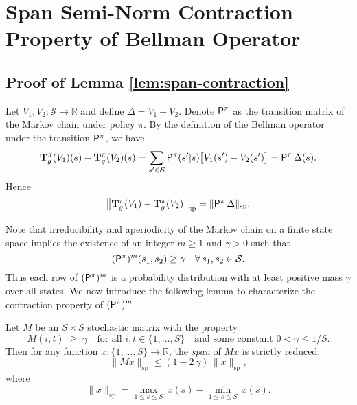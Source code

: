 \appendix

\section{Span Semi-Norm Contraction Property of Bellman Operator}
\subsection{Proof of Lemma \ref{lem:span-contraction}} \label{proofspan-contraction}

Let $V_1, V_2 : \mathcal{S}\to \mathbb{R}$ and define $\Delta = V_1 - V_2$.
Denote $\mathsf P^\pi$ as the transition matrix of the Markov chain under policy $\pi$. By the definition of the Bellman operator under the transition $\mathsf P^\pi$, we have
\begin{equation}
    \mathbf{T}_g^\pi(V_1)(s)- \mathbf{T}_g^\pi(V_2)(s)=\sum_{s' \in \mathcal{S}}
\mathsf P^\pi(s'| s)
\bigl[V_1(s') - V_2(s')\bigr]=\mathsf P^\pi \,\Delta (s).
\end{equation}
Hence
\begin{equation}
\bigl\|\mathbf{T}_g^\pi(V_1) - \mathbf{T}_g^\pi(V_2)\bigr\|_{\mathrm{sp}}=\|\mathsf P^\pi\,\Delta\|_{\mathrm{sp}}.
\end{equation}

Note that irreducibility and aperiodicity of the Markov chain on a finite state space implies \citep{norris1998markov} the existence of an integer $m \ge 1$ and $\gamma > 0$ such that
\begin{equation} \label{eq:m_step_transition}
(\mathsf P^\pi)^m(s_1,s_2)\geq\gamma
\quad
\forall\,s_1,s_2 \in \mathcal{S}.
\end{equation}
Thus each row of $(\mathsf P^\pi)^m$ is a probability distribution with at least positive mass $\gamma$ over all states. We now introduce the following lemma to characterize the contraction property of $(\mathsf P^\pi)^m$,

\begin{lemma}\label{lem:positivity-contraction}
Let $M$ be an $S\times S$ stochastic matrix with the property
\begin{equation} \nonumber 
M(i,t) \;\ge\; \gamma \quad\text{for all } i,t \in \{1,\dots,S\}
\quad\text{and some constant } 0 < \gamma \le 1/S.
\end{equation}
Then for any function $x : \{1,\dots,S\} \to \mathbb{R}$, the {\em span} of $Mx$ is strictly reduced:
\begin{equation}
\|M x\|_{\mathrm{sp}} \leq (1 - 2\,\gamma)\,\|x\|_{\mathrm{sp}},
\end{equation}
where
\begin{equation}
\|x\|_{\mathrm{sp}}=\max_{1 \le s \le S}\,x(s)-\min_{1 \le s \le S}\,x(s).
\end{equation}
\end{lemma}

